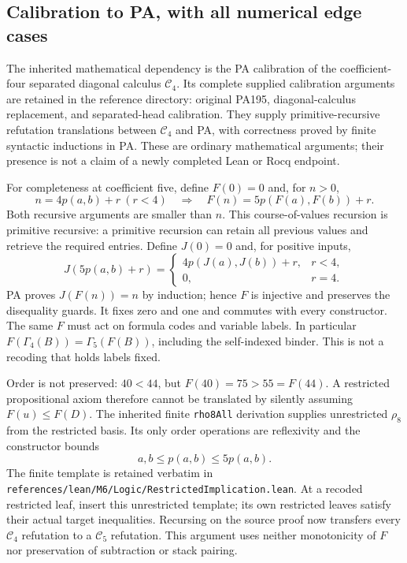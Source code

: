 \subsection{Calibration to PA, with all numerical edge cases}

The inherited mathematical dependency is the PA calibration of the
coefficient-four separated diagonal calculus $\mathcal C_4$. Its complete
supplied calibration arguments are retained in the reference directory:
original PA195, diagonal-calculus replacement, and separated-head
calibration. They supply primitive-recursive refutation translations
between $\mathcal C_4$ and PA, with correctness proved by finite syntactic
inductions in PA. These are ordinary mathematical arguments; their
presence is not a claim of a newly completed Lean or Rocq endpoint.

For completeness at coefficient five, define $F(0)=0$ and, for $n>0$,
\[
 n=4p(a,b)+r\ (r<4)\quad\Longrightarrow\quad
 F(n)=5p(F(a),F(b))+r.
\]
Both recursive arguments are smaller than $n$. This course-of-values
recursion is primitive recursive: a primitive recursion can retain all
previous values and retrieve the required entries. Define $J(0)=0$ and,
for positive inputs,
\[
 J(5p(a,b)+r)=
 \begin{cases}4p(J(a),J(b))+r,&r<4,\\0,&r=4.\end{cases}
\]
PA proves $J(F(n))=n$ by induction; hence $F$ is injective and preserves
the disequality guards. It fixes zero and one and commutes with every
constructor. The same $F$ must act on formula codes and variable labels.
In particular $F(\Gamma_4(B))=\Gamma_5(F(B))$, including the
self-indexed binder. This is not a recoding that holds labels fixed.

Order is not preserved: $40<44$, but $F(40)=75>55=F(44)$.
A restricted propositional axiom therefore cannot be translated by
silently assuming $F(u)\leq F(D)$. The inherited finite
\texttt{rho8All} derivation supplies unrestricted $\rho_8$ from the
restricted basis. Its only order operations are reflexivity and the
constructor bounds
\[
                        a,b\leq p(a,b)\leq5p(a,b).
\]
The finite template is retained verbatim in
\texttt{references/lean/M6/Logic/RestrictedImplication.lean}.
At a recoded restricted leaf, insert this unrestricted template;
its own restricted leaves satisfy their actual target inequalities.
Recursing on the source proof now transfers every $\mathcal C_4$
refutation to a $\mathcal C_5$ refutation. This argument uses neither
monotonicity of $F$ nor preservation of subtraction or stack pairing.

